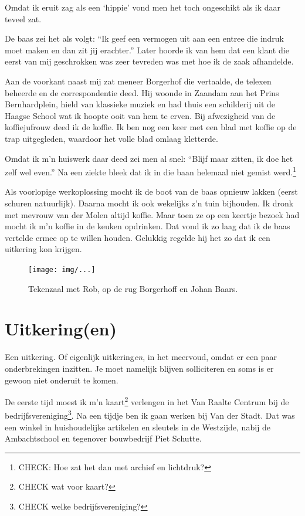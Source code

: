 \documentclass[12pt,twoside]{memoir}
\begin{document}
Omdat ik eruit zag als een `hippie' vond men het toch ongeschikt als ik daar teveel zat.

De baas zei het als volgt: ``Ik geef een vermogen uit aan een entree die indruk moet maken en dan zit jij erachter.'' Later hoorde ik van hem dat een klant die eerst van mij geschrokken was zeer tevreden was met hoe ik de zaak afhandelde.

Aan de voorkant naast mij zat meneer Borgerhof die vertaalde, de telexen beheerde en de correspondentie deed. Hij woonde in Zaandam aan het Prins Bernhardplein, hield van klassieke muziek en had thuis een schilderij uit de Haagse School wat ik hoopte ooit van hem te erven. Bij afwezigheid van de koffiejufrouw deed ik de koffie. Ik ben nog een keer met een blad met koffie op de trap uitgegleden, waardoor het volle blad omlaag kletterde.

Omdat ik m'n huiswerk daar deed zei men al snel: ``Blijf maar zitten, ik doe het zelf wel even.'' Na een ziekte bleek dat ik in die baan helemaal niet gemist werd.\footnote{CHECK: Hoe zat het dan met archief en lichtdruk?} 

Als voorlopige werkoplossing mocht ik de boot van de baas opnieuw lakken (eerst schuren natuurlijk). Daarna mocht ik ook wekelijks z’n tuin bijhouden. Ik dronk met mevrouw van der Molen altijd koffie. Maar toen ze op een keertje bezoek had mocht ik m’n koffie in de keuken opdrinken. Dat vond ik zo laag dat ik de baas vertelde ermee op te willen houden. Gelukkig regelde hij het zo dat ik een uitkering kon krijgen. 

\begin{figure}[t]
\texttt{[image: img/...]}
\caption{Tekenzaal met Rob, op de rug Borgerhoff en Johan Baars.}
\end{figure}

\chapter{Uitkering(en)} %
\label{cha:uitkering_en}

Een uitkering. Of eigenlijk uitkering\emph{en}, in het meervoud, omdat er een paar onderbrekingen inzitten. Je moet namelijk blijven solliciteren en soms is er gewoon niet onderuit te komen. 

De eerste tijd moest ik m'n kaart\footnote{CHECK wat voor kaart?} verlengen in het Van Raalte Centrum bij de bedrijfsvereniging\footnote{CHECK welke bedrijfsvereniging?}. Na een tijdje ben ik gaan werken bij Van der Stadt. Dat was een winkel in huishoudelijke artikelen en sleutels in de Westzijde, nabij de Ambachtschool en tegenover bouwbedrijf Piet Schutte.
\end{document}
